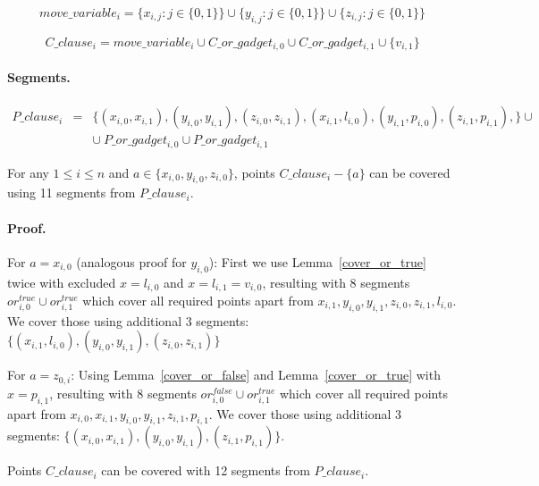  
 $$move\_variable_i = 
 \{x_{i, j} : j \in \{0, 1\}\} \cup
 \{y_{i, j} : j \in \{0, 1\}\} \cup
 \{z_{i, j} : j \in \{0, 1\}\} 
 $$
 
 $$C\_clause_i = 
 move\_variable_i \cup C\_or\_gadget_{i, 0}
 \cup C\_or\_gadget_{i, 1} \cup \{v_{i, 1} \} 
 $$

\paragraph{Segments.}

\begin{eqnarray*}
P\_clause_i & = & \{ (x_{i, 0}, x_{i, 1}),
(y_{i, 0}, y_{i, 1}),
(z_{i, 0}, z_{i, 1}),
(x_{i, 1}, l_{i, 0}),
(y_{i, 1}, p_{i, 0}),
(z_{i, 1}, p_{i, 1}),
\} \cup \\
& & \cup \ P\_or\_gadget_{i, 0} \cup P\_or\_gadget_{i, 1}
\end{eqnarray*}

\begin{lemma}
\label{cover_clauses_solution_true}
For any $1 \le i \le n$ and $a \in \{ x_{i, 0}, y_{i, 0}, z_{i, 0}\}$,
points $C\_clause_i - \{a\}$ can be covered using 11 segments
from $P\_clause_i$.
\end{lemma}

\paragraph{Proof.}
For $a = x_{i, 0}$ (analogous proof for $y_{i, 0}$):
First we use Lemma~\ref{cover_or_true} twice with excluded $x = l_{i, 0}$ and
$x = l_{i, 1} = v_{i, 0}$,
resulting with 8 segments $or^{true}_{i, 0} \cup or^{true}_{i, 1}$
which cover all required points apart from
$x_{i, 1}, y_{i, 0}, y_{i, 1}, z_{i, 0}, z_{i, 1}, l_{i, 0}$.
We cover those using additional 3 segments:
$\{ (x_{i, 1}, l_{i, 0}), (y_{i, 0}, y_{i, 1}),
(z_{i, 0}, z_{i, 1}) \}$

For $a = z_{0, i}$:
Using Lemma~\ref{cover_or_false} and Lemma~\ref{cover_or_true} with
$x = p_{i, 1}$,
resulting with 8 segments $or^{false}_{i, 0} \cup or^{true}_{i, 1}$
which cover all required points apart from
$x_{i, 0}, x_{i, 1}, y_{i, 0}, y_{i, 1}, z_{i, 1}, p_{i, 1}$.
We cover those using additional 3 segments:
$\{ (x_{i, 0}, x_{i, 1}), (y_{i, 0}, y_{i, 1}),
(z_{i, 1}, p_{i, 1}) \}$.

\begin{lemma}
\label{cover_clauses_solution_false}
 Points $C\_clause_i$ can be covered with 12 segments from $P\_clause_i$.
\end{lemma}

